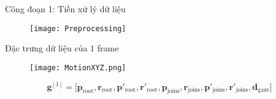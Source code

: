 \begin{frame}{Công đoạn 1: Tiền xử lý dữ liệu}
	\begin{figure}
		\centering
		\texttt{[image: Preprocessing]}
	\end{figure}
	
\end{frame}



\begin{frame}{Đặc trưng dữ liệu của $1$ frame}
	\begin{figure}
		\centering
		\texttt{[image: MotionXYZ.png]}
	\end{figure}
	\begin{equation}
		\mathbf{g}^{[1]} = \Big[ \mathbf{p}_{\text{root}},  \mathbf{r}_{\text{root}},
		\mathbf{ p }'_{\text{root}},  \mathbf{r}'_{\text{root}},
		\mathbf{p}_{\text{joins}},  \mathbf{r}_{\text{joins}},
		\mathbf{p}'_{\text{joins}},  \mathbf{r}'_{\text{joins}},
		\mathbf{d}_{\text{gaze}}
		\Big]
	\end{equation}
	\vspace{-10pt}
	

\end{frame}
